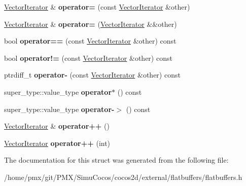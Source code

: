 \begin{DoxyCompactItemize}
\hyperlink{structflatbuffers_1_1VectorIterator}{Vector\+Iterator} \& {\bfseries operator=} (const \hyperlink{structflatbuffers_1_1VectorIterator}{Vector\+Iterator} \&other)
\item 
\mbox{\label{structflatbuffers_1_1VectorIterator_a6089c5bd1920c1ae8e4ffd3ef491b9cb}} 
\hyperlink{structflatbuffers_1_1VectorIterator}{Vector\+Iterator} \& {\bfseries operator=} (\hyperlink{structflatbuffers_1_1VectorIterator}{Vector\+Iterator} \&\&other)
\item 
\mbox{\label{structflatbuffers_1_1VectorIterator_a29ad7618e1c3b1898521339a5ff0878b}} 
bool {\bfseries operator==} (const \hyperlink{structflatbuffers_1_1VectorIterator}{Vector\+Iterator} \&other) const
\item 
\mbox{\label{structflatbuffers_1_1VectorIterator_a7d9cc55f7ea2fccc19a1df3fe5566452}} 
bool {\bfseries operator!=} (const \hyperlink{structflatbuffers_1_1VectorIterator}{Vector\+Iterator} \&other) const
\item 
\mbox{\label{structflatbuffers_1_1VectorIterator_ac6bcc91732e7ff84f886fac5527b0a38}} 
ptrdiff\+\_\+t {\bfseries operator-\/} (const \hyperlink{structflatbuffers_1_1VectorIterator}{Vector\+Iterator} \&other) const
\item 
\mbox{\label{structflatbuffers_1_1VectorIterator_a96ed7d6817ef5d09daebc56174cb4def}} 
super\+\_\+type\+::value\+\_\+type {\bfseries operator$\ast$} () const
\item 
\mbox{\label{structflatbuffers_1_1VectorIterator_ab6e597ec7c6115ab8a49c060e7a0c33a}} 
super\+\_\+type\+::value\+\_\+type {\bfseries operator-\/$>$} () const
\item 
\mbox{\label{structflatbuffers_1_1VectorIterator_aefa0ecf793bc1718fbdb6ea984fbe80b}} 
\hyperlink{structflatbuffers_1_1VectorIterator}{Vector\+Iterator} \& {\bfseries operator++} ()
\item 
\mbox{\label{structflatbuffers_1_1VectorIterator_aeaa5fe982627ecea463ed3eeb54b9882}} 
\hyperlink{structflatbuffers_1_1VectorIterator}{Vector\+Iterator} {\bfseries operator++} (int)
\end{DoxyCompactItemize}


The documentation for this struct was generated from the following file\+:\begin{DoxyCompactItemize}
\item 
/home/pmx/git/\+P\+M\+X/\+Simu\+Cocos/cocos2d/external/flatbuffers/flatbuffers.\+h\end{DoxyCompactItemize}
